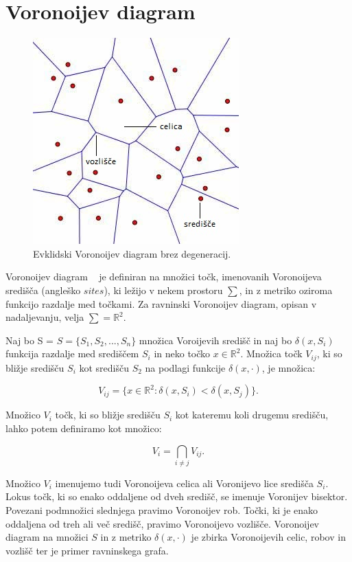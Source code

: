 \documentclass[a4paper, 12pt]{book}
\begin{document}
\section{Voronoijev diagram}
\begin{figure}
\centerline{\includegraphics[scale=0.8]{pics/vd-sredisce.jpg}}
\caption{Evklidski Voronoijev diagram brez degeneracij.}
\label{vd}
\end{figure}

Voronoijev diagram ~\cite{cgalVor} je definiran na množici točk, imenovanih Voronoijeva središča (angleško $sites$), ki ležijo v nekem prostoru $\sum$, in z metriko oziroma funkcijo razdalje med točkami. Za ravninski Voronoijev diagram, opisan v nadaljevanju, velja $\sum = \mathbb{R}^2$.

Naj bo S = $S = \{S_1,S_2,...,S_n\}$ množica Voroijevih središč in naj bo $\delta(x,S_i)$ funkcija razdalje med središčem $S_i$ in neko točko $x \in \mathbb{R}^2$. Množica točk $V_{ij}$, ki so bližje središču $S_i$ kot središču $S_2$ na podlagi funkcije $\delta(x,\cdot)$, je množica:

\begin{equation}
V_{ij} = \{x \in \mathbb{R}^2: \delta(x,S_i) < \delta(x,S_j)\}. 
\end{equation}

Množico $V_i$ točk, ki so bližje središču $S_i$ kot kateremu koli drugemu središču, lahko potem definiramo kot množico:

\begin{equation}
V_i = \bigcap_{i \neq j} V_{ij} .
\end{equation}



Množico $V_i$ imenujemo tudi Voronoijeva celica ali Voronijevo lice središča $S_i$. Lokus točk, ki so enako oddaljene od dveh središč, se imenuje Voronijev bisektor. Povezani podmnožici slednjega pravimo Voronoijev rob. Točki, ki je enako oddaljena od treh ali več središč, pravimo Voronoijevo vozlišče. Voronoijev diagram na množici $S$ in z metriko $\delta(x,\cdot)$ je zbirka Voronoijevih celic, robov in vozlišč ter je primer ravninskega grafa.
\end{document}
